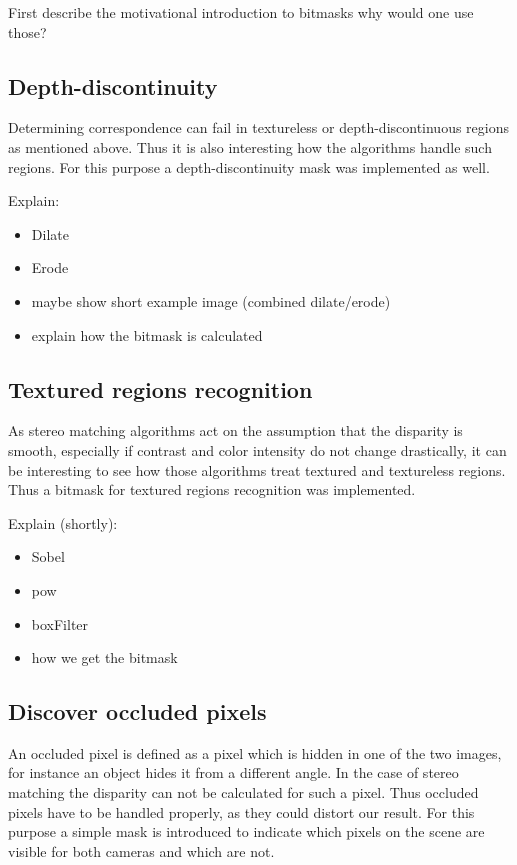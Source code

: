 First describe the motivational introduction to bitmasks why would one use those?

\subsection*{Depth-discontinuity}

Determining correspondence can fail in textureless or depth-discontinuous regions as mentioned above.
Thus it is also interesting how the algorithms handle such regions. For this purpose a depth-discontinuity mask was implemented as well.

Explain:

\begin{itemize}
  \item Dilate
  \item Erode
  \item maybe show short example image (combined dilate/erode)
  \item explain how the bitmask is calculated
\end{itemize}

\subsection*{Textured regions recognition}

As stereo matching algorithms act on the assumption that the disparity is smooth, especially if contrast and color intensity do not change drastically, it can be interesting to see how those algorithms treat textured and textureless regions.
Thus a bitmask for textured regions recognition was implemented.

Explain (shortly):

\begin{itemize}
  \item Sobel
  \item pow
  \item boxFilter
  \item how we get the bitmask
\end{itemize}

\subsection*{Discover occluded pixels}

An occluded pixel is defined as a pixel which is hidden in one of the two images, for instance an object hides it from a different angle.
In the case of stereo matching the disparity can not be calculated for such a pixel.
Thus occluded pixels have to be handled properly, as they could distort our result.
For this purpose a simple mask is introduced to indicate which pixels on the scene are visible for both cameras and which are not.

